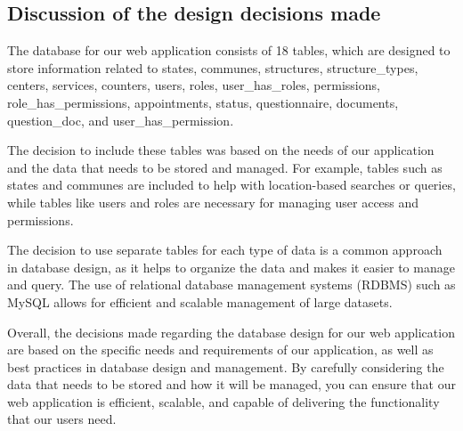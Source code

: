 \subsection{Discussion of the design decisions made}

The database for our web application consists of 18 tables, which are designed to store information related to states, communes, structures, structure\_types, centers, services, counters, users, roles, user\_has\_roles, permissions, role\_has\_permissions, appointments, status, questionnaire, documents, question\_doc, and user\_has\_permission.

The decision to include these tables was  based on the needs of our application and the data that needs to be stored and managed. For example, tables such as states and communes are  included to help with location-based searches or queries, while tables like users and roles are necessary for managing user access and permissions.

The decision to use separate tables for each type of data is a common approach in database design, as it helps to organize the data and makes it easier to manage and query. The use of relational database management systems (RDBMS) such as MySQL allows for efficient and scalable management of large datasets.

Overall, the decisions made regarding the database design for our web application are  based on the specific needs and requirements of our application, as well as best practices in database design and management. By carefully considering the data that needs to be stored and how it will be managed, you can ensure that our web application is efficient, scalable, and capable of delivering the functionality that our users need.